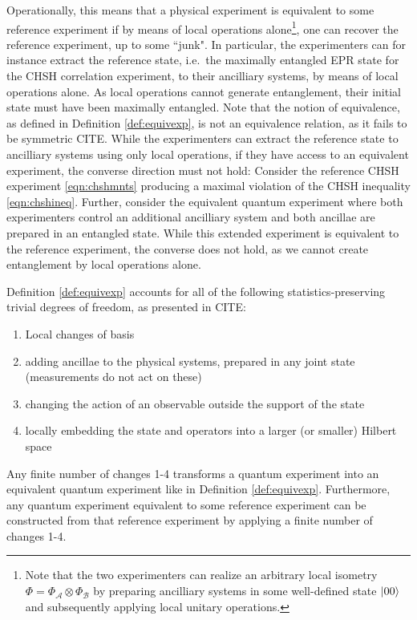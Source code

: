 Operationally, this means that a physical experiment is equivalent to some reference experiment if by means of local operations alone\footnote{Note that the two experimenters can realize an arbitrary local isometry $\Phi=\Phi_{\mathcal{A}}\otimes\Phi_{\mathcal{B}}$ by preparing ancilliary systems in some well-defined state $\ket{00}$ and subsequently applying local unitary operations.}, one can recover the reference experiment, up to some ``junk". In particular, the experimenters can for instance extract the reference state, i.e.\ the maximally entangled EPR state for the CHSH correlation experiment, to their ancilliary systems, by means of local operations alone. As local operations cannot generate entanglement, their initial state must have been maximally entangled. Note that the notion of equivalence, as defined in Definition \ref{def:equivexp}, is not an equivalence relation, as it fails to be symmetric CITE.  While the experimenters can extract the reference state to ancilliary systems using only local operations, if they have access to an equivalent experiment, the converse direction must not hold: Consider the reference CHSH experiment \ref{eqn:chshmnts} producing a maximal violation of the CHSH inequality \ref{eqn:chshineq}. Further, consider the equivalent quantum experiment where both experimenters control an additional ancilliary system and both ancillae are prepared in an entangled state. While this extended experiment is equivalent to the reference experiment, the converse does not hold, as we cannot create entanglement by local operations alone.

Definition \ref{def:equivexp} accounts for all of the following statistics-preserving trivial degrees of freedom, as presented in CITE:
\begin{enumerate}
    \item Local changes of basis
    \item adding ancillae to the physical systems, prepared in any joint state (measurements do not act on these)
    \item changing the action of an observable outside the support of the state
    \item locally embedding the state and operators into a larger (or smaller) Hilbert space
\end{enumerate}

\begin{claim}[CITE]
Any finite number of changes 1-4 transforms a quantum experiment into an equivalent quantum experiment like in Definition \ref{def:equivexp}. Furthermore, any quantum experiment equivalent to some reference experiment can be constructed from that reference experiment by applying  a finite number of changes 1-4.
\end{claim}


